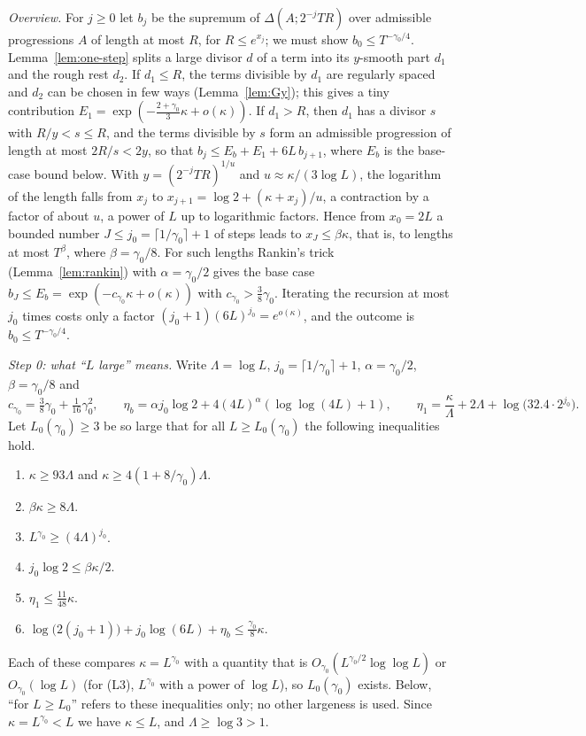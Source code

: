 \smallskip\noindent\emph{Overview.} For $j\ge0$ let $b_j$ be the supremum of $\Delta(A;2^{-j}TR)$ over admissible progressions $A$ of length at most $R$, for $R\le e^{x_j}$; we must show $b_0\le T^{-\gamma_0/4}$. Lemma~\ref{lem:one-step} splits a large divisor $d$ of a term into its $y$-smooth part $d_1$ and the rough rest $d_2$. If $d_1\le R$, the terms divisible by $d_1$ are regularly spaced and $d_2$ can be chosen in few ways (Lemma~\ref{lem:Gy}); this gives a tiny contribution $E_1=\exp(-\frac{2+\gamma_0}3\kappa+o(\kappa))$. If $d_1>R$, then $d_1$ has a divisor $s$ with $R/y<s\le R$, and the terms divisible by $s$ form an admissible progression of length at most $2R/s<2y$, so that $b_j\le E_b+E_1+6L\,b_{j+1}$, where $E_b$ is the base-case bound below. With $y=(2^{-j}TR)^{1/u}$ and $u\approx\kappa/(3\log L)$, the logarithm of the length falls from $x_j$ to $x_{j+1}=\log2+(\kappa+x_j)/u$, a contraction by a factor of about $u$, a power of $L$ up to logarithmic factors. Hence from $x_0=2L$ a bounded number $J\le j_0=\lceil1/\gamma_0\rceil+1$ of steps leads to $x_J\le\beta\kappa$, that is, to lengths at most $T^\beta$, where $\beta=\gamma_0/8$. For such lengths Rankin's trick (Lemma~\ref{lem:rankin}) with $\alpha=\gamma_0/2$ gives the base case $b_J\le E_b=\exp(-c_{\gamma_0}\kappa+o(\kappa))$ with $c_{\gamma_0}>\frac38\gamma_0$. Iterating the recursion at most $j_0$ times costs only a factor $(j_0+1)(6L)^{j_0}=e^{o(\kappa)}$, and the outcome is $b_0\le T^{-\gamma_0/4}$.

\medskip\noindent\emph{Step 0: what ``$L$ large'' means.} Write $\Lambda=\log L$, $j_0=\lceil1/\gamma_0\rceil+1$, $\alpha=\gamma_0/2$, $\beta=\gamma_0/8$ and
\[
c_{\gamma_0}=\tfrac38\gamma_0+\tfrac1{16}\gamma_0^2,\qquad
\eta_b=\alpha j_0\log2+4(4L)^{\alpha}(\log\log(4L)+1),\qquad
\eta_1=\frac\kappa\Lambda+2\Lambda+\log\bigl(32.4\cdot2^{j_0}\bigr).
\]
Let $L_0(\gamma_0)\ge3$ be so large that for all $L\ge L_0(\gamma_0)$ the following inequalities hold.
\begin{enumerate}[label=(L\arabic*),leftmargin=*]
\item $\kappa\ge93\Lambda$ and $\kappa\ge4(1+8/\gamma_0)\Lambda$.
\item $\beta\kappa\ge8\Lambda$.
\item $L^{\gamma_0}\ge(4\Lambda)^{j_0}$.
\item $j_0\log2\le\beta\kappa/2$.
\item $\eta_1\le\frac{11}{48}\kappa$.
\item $\log\bigl(2(j_0+1)\bigr)+j_0\log(6L)+\eta_b\le\frac{\gamma_0}8\kappa$.
\end{enumerate}
Each of these compares $\kappa=L^{\gamma_0}$ with a quantity that is $O_{\gamma_0}(L^{\gamma_0/2}\log\log L)$ or $O_{\gamma_0}(\log L)$ (for (L3), $L^{\gamma_0}$ with a power of $\log L$), so $L_0(\gamma_0)$ exists. Below, ``for $L\ge L_0$'' refers to these inequalities only; no other largeness is used. Since $\kappa=L^{\gamma_0}<L$ we have $\kappa\le L$, and $\Lambda\ge\log3>1$.

